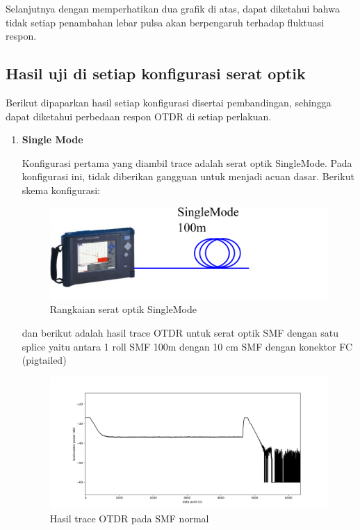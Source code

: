 \documentclass[12pt]{article}
\begin{document}
	Selanjutnya dengan memperhatikan dua grafik di atas, dapat diketahui bahwa tidak setiap penambahan lebar pulsa akan berpengaruh terhadap fluktuasi respon.
	
	\newpage
	\subsection{Hasil uji di setiap konfigurasi serat optik}
	
	Berikut dipaparkan hasil setiap konfigurasi disertai pembandingan, sehingga dapat diketahui perbedaan respon OTDR di setiap perlakuan.
	
	\begin{enumerate}
		\item \textbf{Single Mode}

		Konfigurasi pertama yang diambil trace adalah serat optik SingleMode.
		Pada konfigurasi ini, tidak diberikan gangguan untuk menjadi acuan dasar.
		Berikut skema konfigurasi:
		
		\begin{figure}[!ht]
			\centering
			\captionsetup{justification=centering}
			\includegraphics[width=0.6\linewidth]{images/Bab_4/s_basic}
			\caption[Trace SMF-SMF]{\small{Rangkaian serat optik SingleMode}}
		\end{figure}
	
		dan berikut adalah hasil trace OTDR untuk serat optik SMF dengan satu splice yaitu antara 1 roll SMF 100m dengan 10 cm SMF dengan konektor FC (pigtailed)
		
		\begin{figure}[!ht]
			\centering
			\captionsetup{justification=centering}
			\includegraphics[width=\linewidth]{images/Bab_4/Bab_4_3a1}
			\caption[Trace SMF]{\small{Hasil trace OTDR pada SMF normal}}
		\end{figure}
	

\end{enumerate}
\end{document}
